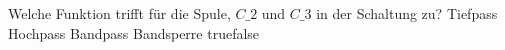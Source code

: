     {Welche Funktion trifft für die Spule, $C\_2$ und $C\_3$ in der Schaltung zu?}
    {Tiefpass}
    {Hochpass}
    {Bandpass}
    {Bandsperre}
    {true}{false}